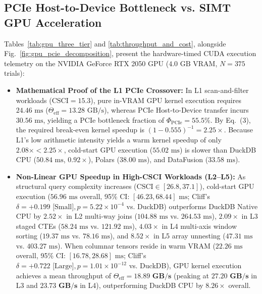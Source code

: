 \documentclass[10pt,a4paper]{article}
\begin{document}
\subsection{PCIe Host-to-Device Bottleneck vs. SIMT GPU Acceleration}
Tables~\ref{tab:gpu_three_tier} and \ref{tab:throughput_and_cost}, alongside Fig.~\ref{fig:gpu_pcie_decomposition}, present the hardware-timed CUDA execution telemetry on the NVIDIA GeForce RTX 2050 GPU ($4.0\text{ GB}$ VRAM, $N=375$ trials):
\begin{itemize}[leftmargin=1.5em,itemsep=2pt]
    \item \textbf{Mathematical Proof of the L1 PCIe Crossover:} In L1 scan-and-filter workloads ($\text{CSCI}=15.3$), pure in-VRAM GPU kernel execution requires $24.46\text{ ms}$ ($\Theta_{\text{eff}} = 13.28\text{ GB/s}$), whereas PCIe Host-to-Device transfer incurs $30.56\text{ ms}$, yielding a PCIe bottleneck fraction of $\Phi_{\text{PCIe}} = 55.5\%$. By Eq.~(3), the required break-even kernel speedup is $(1 - 0.555)^{-1} = \mathbf{2.25\times}$. Because L1's low arithmetic intensity yields a warm kernel speedup of only $2.08\times < 2.25\times$, cold-start GPU execution ($55.02\text{ ms}$) is slower than DuckDB CPU ($50.84\text{ ms}$, $0.92\times$), Polars ($38.00\text{ ms}$), and DataFusion ($33.58\text{ ms}$).
    \item \textbf{Non-Linear GPU Speedup in High-CSCI Workloads (L2--L5):} As structural query complexity increases ($\text{CSCI} \in [26.8, 37.1]$), cold-start GPU execution ($56.96\text{ ms}$ overall, 95\% CI: $[46.23, 68.44]\text{ ms}$; Cliff's $\delta = +0.199\text{ [Small]}, p = 5.22 \times 10^{-4}$ vs. DuckDB) outperforms DuckDB Native CPU by $\mathbf{2.52\times}$ in L2 multi-way joins ($104.88\text{ ms}$ vs. $264.53\text{ ms}$), $\mathbf{2.09\times}$ in L3 staged CTEs ($58.24\text{ ms}$ vs. $121.92\text{ ms}$), $\mathbf{4.03\times}$ in L4 multi-axis window sorting ($19.37\text{ ms}$ vs. $78.16\text{ ms}$), and $\mathbf{8.52\times}$ in L5 array unnesting ($47.31\text{ ms}$ vs. $403.27\text{ ms}$). When columnar tensors reside in warm VRAM ($22.26\text{ ms}$ overall, 95\% CI: $[16.78, 28.68]\text{ ms}$; Cliff's $\delta = +0.722\text{ [Large]}, p = 1.01 \times 10^{-12}$ vs. DuckDB), GPU kernel execution achieves a mean throughput of $\Theta_{\text{eff}} = \mathbf{18.89\text{ GB/s}}$ (peaking at $\mathbf{27.20\text{ GB/s}}$ in L3 and $\mathbf{23.73\text{ GB/s}}$ in L4), outperforming DuckDB CPU by $\mathbf{8.26\times}$ overall.
\end{itemize}
\end{document}
